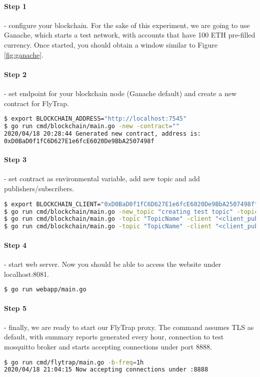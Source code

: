 \paragraph{Step 1} - configure your blockchain. For the sake of this experiment, we are going to use Ganache, which starts a test network, with accounts that have 100 ETH pre-filled currency. Once started, you should obtain a window similar to Figure \ref{fig:ganache}.
\paragraph{Step 2} - set endpoint for your blockchain node (Ganache default) and create a new contract for FlyTrap.
\begin{lstlisting}[language=bash]
$ export BLOCKCHAIN_ADDRESS="http://localhost:7545"
$ go run cmd/blockchain/main.go -new -contract=""
2020/04/18 20:28:44 Generated new contract, address is:
0xD0BaD0f1fC6D627E1e6fcE6020De9BbA2507498f
\end{lstlisting}
\paragraph{Step 3} - set contract as environmental variable, add new topic and add publishers/subscribers.
\begin{lstlisting}[language=bash,breaklines=true]
$ export BLOCKCHAIN_CLIENT="0xD0BaD0f1fC6D627E1e6fcE6020De9BbA2507498f"
$ go run cmd/blockchain/main.go -new_topic "creating test topic" -topic "TopicName"
$ go run cmd/blockchain/main.go -topic "TopicName" -client "<client_pubkey>" -pub "adding test publisher"
$ go run cmd/blockchain/main.go -topic "TopicName" -client "<client_pubkey>" -sub "adding test subscriber"
\end{lstlisting}
\paragraph{Step 4} - start web server. Now you should be able to access the website under localhost:8081.
\begin{lstlisting}[language=bash,breaklines=true]
$ go run webapp/main.go
\end{lstlisting}
\paragraph{Step 5} - finally, we are ready to start our FlyTrap proxy. The command assumes TLS as default, with summary reports generated every hour, connection to test mosquitto broker and starts accepting connections under port 8888.
\begin{lstlisting}[language=bash,breaklines=true]
$ go run cmd/flytrap/main.go -b-freq=1h
2020/04/18 21:04:15 Now accepting connections under :8888
\end{lstlisting}
